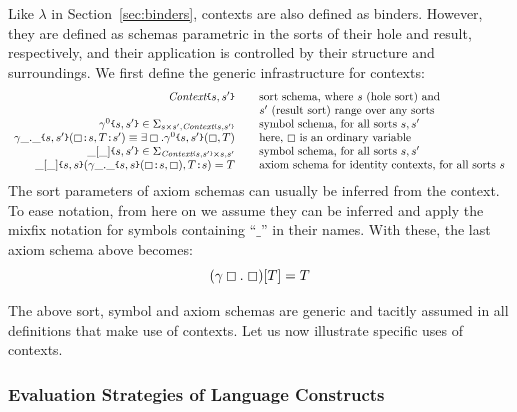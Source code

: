 \documentclass[UTF8,11pt]{article}
\theoremstyle{plain}
\theoremstyle{definition}
\theoremstyle{remark}
\newcommand{\cln}{\texttt{:}}
\newcommand{\Context}{\textit{Context}}
\newcommand{\hole}{\boxempty}
\newcommand{\parametric}[2]{{#1}\raisebox{.2ex}{\texttt{\footnotesize{\{}}}#2\raisebox{.2ex}{\texttt{\footnotesize{\}}}}}
\newcommand{\parametricscript}[2]{{#1}\raisebox{.2ex}{\texttt{\tiny{\{}}}#2\raisebox{.2ex}{\texttt{\tiny{\}}}}}
\begin{document}
Like $\lambda$ in Section~\ref{sec:binders}, contexts are also defined
as binders.
However, they are defined as schemas parametric in the sorts of their
hole and result, respectively, and their application is controlled by
their structure and surroundings.
We first define the generic infrastructure for contexts:
$$
\begin{array}{r@{\hspace*{5ex}}l}
\parametric{\Context}{s,s'} &
\textrm{sort schema, where $s$ (hole sort) and}
\\ &\textrm{$s'$ (result sort) range over any sorts}
\\ \parametric{\gamma^0}{s,s'} \in \Sigma_{s \times s', \parametricscript{\Context}{s,s'}}
& \textrm{symbol schema, for all sorts $s, s'$}
\\ \parametric{\gamma\_.\_}{s,s'}(\hole\cln s,T\cln s') \equiv \exists \hole . \parametric{\gamma^0}{s,s'}(\hole,T)
& \textrm{here, $\hole$ is an ordinary variable}
\\
\parametric{\_[\_]}{s,s'} \in \Sigma_{\parametricscript{\Context}{s,s'} \times s, s'}
& \textrm{symbol schema, for all sorts $s, s'$}
\\
\parametric{\_[\_]}{s,s}(\parametric{\gamma\_.\_}{s,s}(\hole\cln s, \hole),T\cln s) = T
& \textrm{axiom schema for identity contexts, for all sorts $s$}
\end{array}
$$
The sort parameters of axiom schemas can usually be inferred from the context.
To ease notation, from here on we assume they can be inferred and apply the
mixfix notation for symbols containing ``$\_$'' in their names.
With these, the last axiom schema above becomes:
$$
(\gamma \hole .\; \hole)[T] = T
$$

The above sort, symbol and axiom schemas are generic and tacitly assumed in
all definitions that make use of contexts.
Let us now illustrate specific uses of contexts.

\subsubsection{Evaluation Strategies of Language Constructs}
\end{document}

